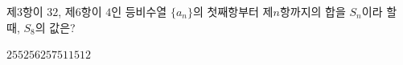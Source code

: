 제$3$항이 $32$, 제$6$항이 $4$인 등비수열 $\{a_n\}$의 첫째항부터 제$n$항까지의 합을 $S_n$이라 할 때, $S_8$의 값은?
\begin{choices32}{$255$}{$256$}{$257$}{$511$}{$512$}\end{choices32}
